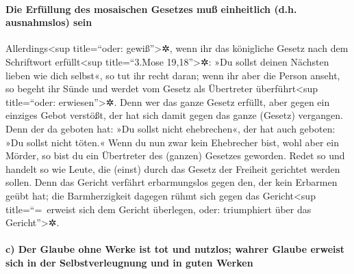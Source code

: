 \hypertarget{die-erfuxfcllung-des-mosaischen-gesetzes-muuxdf-einheitlich-d.h.-ausnahmslos-sein}{%
\paragraph{Die Erfüllung des mosaischen Gesetzes muß einheitlich (d.h.
ausnahmslos)
sein}\label{die-erfuxfcllung-des-mosaischen-gesetzes-muuxdf-einheitlich-d.h.-ausnahmslos-sein}}

 Allerdings\textless sup title=``oder:
gewiß''\textgreater✲, wenn ihr das königliche Gesetz nach dem
Schriftwort erfüllt\textless sup title=``3.Mose 19,18''\textgreater✲:
»Du sollst deinen Nächsten lieben wie dich selbst«, so tut ihr recht
daran;  wenn ihr aber die Person anseht, so begeht ihr
Sünde und werdet vom Gesetz als Übertreter überführt\textless sup
title=``oder: erwiesen''\textgreater✲.  Denn wer das
ganze Gesetz erfüllt, aber gegen ein einziges Gebot verstößt, der hat
sich damit gegen das ganze (Gesetz) vergangen.  Denn der
da geboten hat: »Du sollst nicht ehebrechen«, der hat auch geboten: »Du
sollst nicht töten.« Wenn du nun zwar kein Ehebrecher bist, wohl aber
ein Mörder, so bist du ein Übertreter des (ganzen) Gesetzes geworden.
 Redet so und handelt so wie Leute, die (einst) durch das
Gesetz der Freiheit gerichtet werden sollen.  Denn das
Gericht verfährt erbarmungslos gegen den, der kein Erbarmen geübt hat;
die Barmherzigkeit dagegen rühmt sich gegen das Gericht\textless sup
title=``=~erweist sich dem Gericht überlegen, oder: triumphiert über das
Gericht''\textgreater✲.

\hypertarget{c-der-glaube-ohne-werke-ist-tot-und-nutzlos-wahrer-glaube-erweist-sich-in-der-selbstverleugnung-und-in-guten-werken}{%
\paragraph{c) Der Glaube ohne Werke ist tot und nutzlos; wahrer Glaube
erweist sich in der Selbstverleugnung und in guten
Werken}\label{c-der-glaube-ohne-werke-ist-tot-und-nutzlos-wahrer-glaube-erweist-sich-in-der-selbstverleugnung-und-in-guten-werken}}

